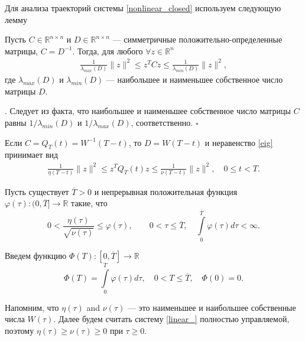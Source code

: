 \documentclass[../main.tex]{subfiles}
\begin{document}
Для анализа траекторий системы \eqref{nonlinear_closed} используем следующую лемму
\begin{lemma}\label{lem:zqz} 
    Пусть $C\in \mathbb{R}^{ n \times n}$ и $D\in \mathbb{R}^{n \times n}$ --- симметричные положительно-определенные матрицы, $C=D^{-1}$. Тогда, для любого $\forall z \in \mathbb{R}^{n}$   
    \begin{gather} \label{eig}
        \frac{1}{\lambda_{max}(D)} \|z\|^2 \leqslant z^T C z \leqslant \frac{1}{\lambda_{min}(D)} \|z\|^2,
    \end{gather}
    где $\lambda_{max}(D)$ и $\lambda_{min}(D)$ --- наибольшее и наименьшее собственное число матрицы $D$.
\end{lemma}
\doc. 
  Следует из факта, что наибольшее и наименьшее собственное число матрицы $C$ равны $1/{\lambda_{min}(D)}$ и $1/{\lambda_{max}(D)}$, соответственно. \hfill $ \square $

Если $C=Q_T(t)=W^{-1}(T-t)$, то $D=W(T-t)$ и неравенство \eqref{eig} принимает вид
\begin{gather*} %
        \frac{1}{\eta(T-t)} \|z\|^2 \leqslant z^T Q_T(t) z \leqslant \frac{1}{\nu(T-t)} \|z\|^2, \quad 0\leqslant t < T.
    \end{gather*}
\begin{assumption} \label{asm1}   
   Пусть существует $\overline{T}>0$ и непрерывная положительная функция $\varphi(\tau): (0, \overline{T}] \to \mathbb{R}$ такие, что
\begin{equation*}
    0 < \frac{\eta(\tau)}{\sqrt{\nu(\tau)}} \leqslant \varphi(\tau), \qquad 0 < \tau \leqslant \overline{T},\quad \int\limits_0^ {\overline{T}}\varphi(\tau) d\tau<\infty.
\end{equation*} 
\end{assumption}
Введем функцию $\Phi(T): [0, \overline{T}] \to \mathbb{R}$
\begin{equation*}
    \Phi(T)= \int\limits_0^ {T}\varphi(\tau) d\tau,\quad 0 <  T \leqslant \overline{T},\quad  \Phi(0)=0.
\end{equation*} 

Напомним, что $\eta(\tau)$ and $\nu(\tau)$ --- это наименьшее и наибольшее собственные числа $W(\tau)$. 
Далее будем считать систему \eqref{linear_} полностью управляемой, поэтому $\eta(\tau) \geqslant \nu(\tau) \geqslant 0$ при $\tau \geq 0$.
 
\end{document}
